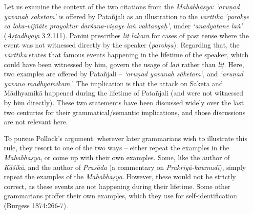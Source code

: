 Let us examine the context of the two citations from the {\sl Mahābhāṣya}:  {\sl `aruṇad yavanaḥ sāketam'} is offered by Patañjali as an illustration to the {\sl vārttika `parokṣe ca loka-vijñāte prayoktur darśana-viṣaye laṅ vaktavyaḥ'}, under {\sl `anadyatane laṅ'} ({\sl Aṣṭādhyāyī} 3.2.111). Pānini prescribes {\sl liṭ lakāra} for cases of past tense where the event was not witnessed directly by the speaker ({\sl parokṣa}). Regarding that, the {\sl vārttika} states that famous events happening in the lifetime of the speaker, which could have been witnessed by him, govern the usage of {\sl laṅ} rather than {\sl liṭ}. Here, two examples are offered by Patañjali -- {\sl `aruṇad yavanaḥ sāketam'}, and {\sl `aruṇad yavano mādhyamikām'}. The implication is that the attack on Sāketa and Mādhyamikā happened during the lifetime of Patañjali (and were not witnessed by him directly). These two statements have been discussed widely over the last two centuries for their grammatical/semantic implications, and those discussions are not relevant here.

To pursue Pollock's argument: wherever later grammarians wish to illustrate this rule, they resort to one of the two ways -- either repeat the examples in the {\sl Mahābhāṣya}, or come up with their own examples. Some, like the author of {\sl Kāśikā}, and the author of {\sl Prasāda} (a commentary on {\sl Prakriyā-kaumudī}), simply repeat the examples of the {\sl Mahābhāṣya}. However, these would not be strictly correct, as these events are not happening during their lifetime. Some other grammarians proffer their own examples, which they use for self-identification (Burgess 1874:266-7).

